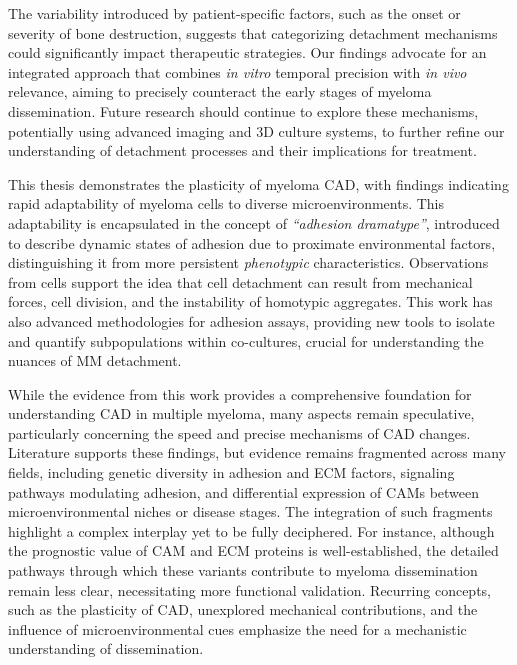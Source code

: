 The variability introduced by patient-specific factors, such as the onset or
severity of bone destruction, suggests that categorizing detachment mechanisms
could significantly impact therapeutic strategies. Our findings advocate for an
integrated approach that combines \textit{in vitro} temporal precision with
\textit{in vivo} relevance, aiming to precisely counteract the early stages of
myeloma dissemination. Future research should continue to explore these
mechanisms, potentially using advanced imaging and 3D culture systems, to
further refine our understanding of detachment processes and their implications
for treatment.


\newpage
{}%
\label{sec:discussion:conclusioncancer}%

This thesis demonstrates the plasticity of myeloma
\acf{CAD}, with findings indicating rapid adaptability of
myeloma cells to diverse microenvironments. This adaptability is encapsulated in
the concept of \emph{“adhesion dramatype”}, introduced to
describe dynamic states of adhesion due to proximate environmental factors,
distinguishing it from more persistent \emph{phenotypic} characteristics.
Observations from \INA cells support the idea that cell detachment can result
from mechanical forces, cell division, and the instability of homotypic
aggregates.
This work has also advanced methodologies for adhesion
assays, providing new tools to isolate and quantify subpopulations within
co-cultures, crucial for understanding the nuances of MM detachment.

While the evidence from this work provides a comprehensive foundation for
understanding \ac{CAD} in multiple myeloma, many aspects remain speculative,
particularly concerning the speed and precise mechanisms of \ac{CAD} changes.
Literature supports these findings, but evidence remains fragmented across many
fields, including genetic diversity in adhesion and \ac{ECM} factors, signaling
pathways modulating adhesion, and differential expression of \acp{CAM} between
microenvironmental niches or disease stages. The integration of such fragments
highlight a complex interplay yet to be fully deciphered. For instance, although
the prognostic value of \ac{CAM} and \ac{ECM} proteins is well-established, the
detailed pathways through which these variants contribute to myeloma
dissemination remain less clear, necessitating more functional validation.
Recurring concepts, such as the plasticity of \ac{CAD}, unexplored mechanical
contributions, and the influence of microenvironmental cues emphasize
the need for a mechanistic understanding of dissemination.

